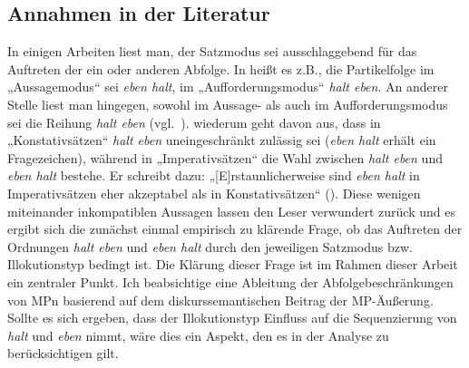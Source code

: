 \subsection{Annahmen in der Literatur}
\label{sec:anlit}
In einigen Arbeiten liest man, der Satzmodus  sei ausschlaggebend für das Auftreten der ein oder anderen Abfolge. In \citet[1542--1543]{Zifonun1997} heißt es z.B., die Partikelfolge im „Aussagemodus“  sei \textit{eben halt}, im   „Aufforderungsmodus“ \textit{halt eben}. An anderer Stelle liest man hingegen, sowohl im Aussage- als auch im Aufforderungsmodus sei die Reihung \textit{halt eben} (vgl.\ \citealt[908--909]{Zifonun1997}). \citet[227/230/234]{Dahl1988} wiederum geht davon aus, dass in „Konstativsätzen“ \textit{halt eben} uneingeschränkt zulässig sei (\textit{eben halt} erhält ein Fragezeichen), während in „Imperativsätzen“ die Wahl zwischen \textit{halt eben} und \textit{eben halt} bestehe. Er schreibt dazu: „[E]rstaunlicherweise sind \textit{eben halt} in Imperativsätzen eher akzeptabel als in Konstativsätzen“ (\citealt[250]{Dahl1988}). Diese wenigen miteinander inkompatiblen Aussagen lassen den Leser verwundert zurück und es ergibt sich die zunächst einmal empirisch zu klärende Frage, ob das Auftreten der Ordnungen \textit{halt eben} und \textit{eben halt} durch den je\-weiligen Satzmodus bzw. Illokutionstyp bedingt ist. Die Klärung dieser Frage ist im Rahmen dieser Arbeit ein zentraler Punkt. Ich beabsichtige eine Ableitung der Abfolgebeschränkungen von MPn basierend auf dem diskurssemantischen Beitrag der MP-Äußerung. Sollte es sich ergeben, dass der Illokutionstyp Einfluss auf die Sequenzierung von \textit{halt} und \textit{eben} nimmt, wäre dies ein Aspekt, den es in der Analyse zu berücksichtigen gilt.

